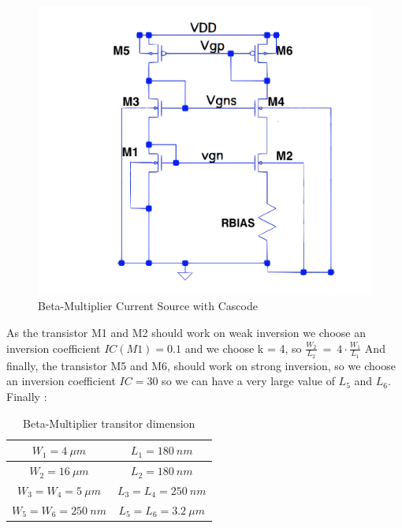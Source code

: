 \documentclass[11pt,a4paper]{report}
\begin{document}
\begin{figure}[h]
  \begin{center}
    \includegraphics[scale=0.35]{photo/beta_multiplier_c}
  \end{center}
  \caption{Beta-Multiplier Current Source with Cascode}
  \label{beta_m_C}
\end{figure}

As the transistor M1 and M2 should work on weak inversion we choose an inversion coefficient $IC(M1) = 0.1$ and we choose k = 4, so $\frac{W_2}{L_2}~=~4\cdot\frac{W_1}{L_1} $
And finally, the transistor M5 and M6, should work on strong inversion, so we choose an inversion coefficient $IC = 30$ so we can have a very large value of $L_5$ and $L_6$. Finally : 

\begin{table}[h]
  \begin{center}
  \begin{tabular}{|c|c|}\hline
    $W_1 = 4~\mu m$       & $L_1 = 180~ nm$ \\ \hline
    $W_2 =  16~ \mu m$       & $L_2 = 180~ nm$ \\ \hline
    $W_3 = W_4 = 5~ \mu m$ & $L_3 = L_4 = 250~ nm$  \\ \hline
    $W_5 = W_6 = 250~nm$ & $L_5 = L_6 = 3.2~\mu m$ \\ \hline
  \end{tabular}
\end{center}
\caption{Beta-Multiplier transitor dimension}
\end{table}
\end{document}
